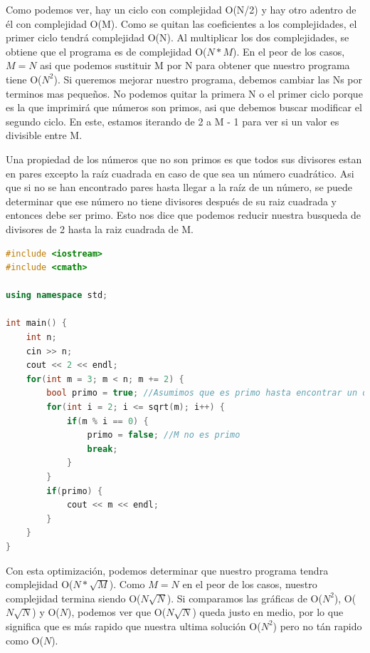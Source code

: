 \documentclass{article}
\begin{document}
Como podemos ver, hay un ciclo con complejidad O(N/2) y hay otro adentro de él con complejidad O(M). Como se quitan las coeficientes a los complejidades, el primer ciclo tendrá complejidad O(N). Al multiplicar los dos complejidades, se obtiene que el programa es de complejidad O($N * M$). En el peor de los casos, $M = N$ asi que podemos sustituir M por N para obtener que nuestro programa tiene O($N^2$). Si queremos mejorar nuestro programa, debemos cambiar las Ns por terminos mas pequeños. No podemos quitar la primera N o el primer ciclo porque es la que imprimirá que números son primos, asi que debemos buscar modificar el segundo ciclo. En este, estamos iterando de 2 a M - 1 para ver si un valor es divisible entre M.

Una propiedad de los números que no son primos es que todos sus divisores estan en pares excepto la raíz cuadrada en caso de que sea un número cuadrático. Asi que si no se han encontrado pares hasta llegar a la raíz de un número, se puede determinar que ese número no tiene divisores después de su raiz cuadrada y entonces debe ser primo. Esto nos dice que podemos reducir nuestra busqueda de divisores de 2 hasta la raiz cuadrada de M.

\begin{lstlisting}[language=C++, caption=¿Optimizando?]
#include <iostream>
#include <cmath>

using namespace std;

int main() {
    int n;
    cin >> n;
    cout << 2 << endl;
    for(int m = 3; m < n; m += 2) {
        bool primo = true; //Asumimos que es primo hasta encontrar un divisor
        for(int i = 2; i <= sqrt(m); i++) {
            if(m % i == 0) {
                primo = false; //M no es primo
                break;
            }
        }
        if(primo) {
            cout << m << endl;
        }
    }
}
\end{lstlisting}

Con esta optimización, podemos determinar que nuestro programa tendra complejidad O($N * \sqrt{M}$). Como $M = N$ en el peor de los casos, nuestro complejidad termina siendo O($N \sqrt{N}$). Si comparamos las gráficas de O($N^2$), O($N \sqrt{N}$) y O($N$), podemos ver que O($N \sqrt{N}$) queda justo en medio, por lo que significa que es más rapido que nuestra ultima solución O($N^2$) pero no tán rapido como O($N$).
\end{document}
